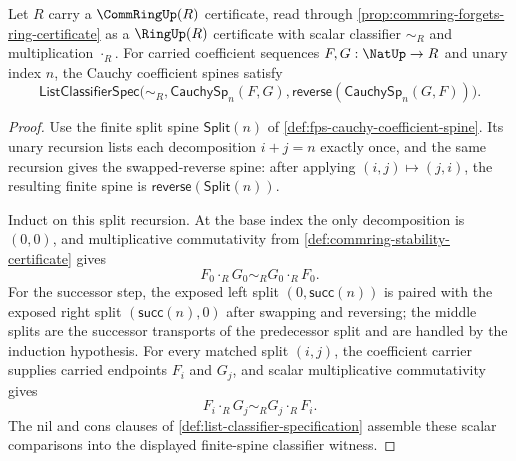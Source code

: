 \begin{lemma}
\label{lem:fps-cauchy-coefficient-spine-swapped-reverse}
Let $R$ carry a $\CommRingUp(R)$ certificate, read through \autoref{prop:commring-forgets-ring-certificate} as a $\RingUp(R)$ certificate with scalar classifier $\sim_R$ and multiplication $\cdot_R$. For carried coefficient sequences $F,G:\NatUp\to R$ and unary index $n$, the Cauchy coefficient spines satisfy
$$
\mathsf{ListClassifierSpec}\bigl(\sim_R,
\mathsf{CauchySp}_n(F,G),
\mathsf{reverse}(\mathsf{CauchySp}_n(G,F))\bigr).
$$
\end{lemma}
\begin{proof}
Use the finite split spine $\mathsf{Split}(n)$ of \autoref{def:fps-cauchy-coefficient-spine}. Its unary recursion lists each decomposition $i+j=n$ exactly once, and the same recursion gives the swapped-reverse spine: after applying $(i,j)\mapsto(j,i)$, the resulting finite spine is $\mathsf{reverse}(\mathsf{Split}(n))$.

Induct on this split recursion. At the base index the only decomposition is $(0,0)$, and multiplicative commutativity from \autoref{def:commring-stability-certificate} gives
$$
F_0\cdot_R G_0\sim_R G_0\cdot_R F_0.
$$
For the successor step, the exposed left split $(0,\mathsf{succ}(n))$ is paired with the exposed right split $(\mathsf{succ}(n),0)$ after swapping and reversing; the middle splits are the successor transports of the predecessor split and are handled by the induction hypothesis. For every matched split $(i,j)$, the coefficient carrier supplies carried endpoints $F_i$ and $G_j$, and scalar multiplicative commutativity gives
$$
F_i\cdot_R G_j\sim_R G_j\cdot_R F_i.
$$
The nil and cons clauses of \autoref{def:list-classifier-specification} assemble these scalar comparisons into the displayed finite-spine classifier witness.
\end{proof}


